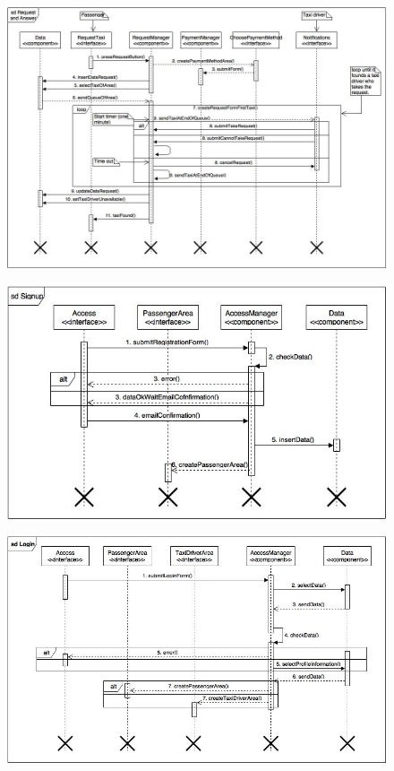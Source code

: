 		\begin{landscape}
			\newpage
				\begin{figure}[h]
					\centering
					\includegraphics[scale=0.65]{Diagrams/SDRequest.jpg}
				\end{figure}
			\newpage
				\begin{figure}[h]
					\centering
					\includegraphics[scale=0.95]{Diagrams/SDSignup.jpg}
				\end{figure}
			\newpage
			\begin{figure}[h]
				\centering
				\includegraphics[scale=0.75]{Diagrams/SDLogin.jpg}

\end{figure}
\end{landscape}
